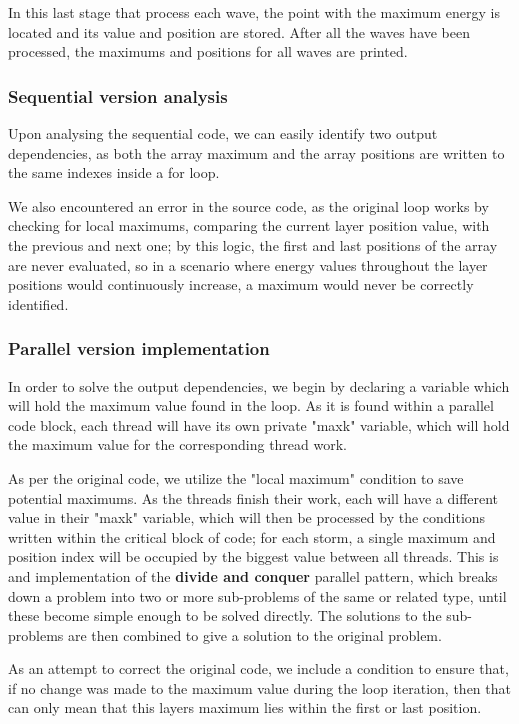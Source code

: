 
In this last stage that process each wave, the
point with the maximum energy is located and its value and position are stored.
After all the waves have been processed, the maximums and positions for all waves
are printed.
\subsubsection{Sequential version analysis}
Upon analysing the sequential code, we can easily identify two output dependencies, as both the array maximum and the array positions are written to the same indexes inside a for loop. 

We also encountered an error in the source code, as the original loop works by checking for local maximums, comparing the current layer position value, with the previous and next one; by this logic, the first and last positions of the array are never evaluated, so in a scenario where energy values throughout the layer positions would continuously increase, a maximum would never be correctly identified.
\subsubsection{Parallel version implementation}
In order to solve the output dependencies, we begin by declaring a variable which will hold the maximum value found in the loop. As it is found within a parallel code block, each thread will have its own private "maxk" variable, which will hold the maximum value for the corresponding thread work.

As per the original code, we utilize the "local maximum" condition to save potential maximums. As the threads finish their work, each will have a different value in their "maxk" variable, which will then be processed by the conditions written within the critical block of code; for each storm, a single maximum and position index will be occupied by the biggest value between all threads. This is and implementation of the \textbf{divide and conquer} parallel pattern, which breaks down a problem into two or more sub-problems of the same or related type, until these become simple enough to be solved directly. The solutions to the sub-problems are then combined to give a solution to the original problem.

As an attempt to correct the original code, we include a condition to ensure that, if no change was made to the maximum value during the loop iteration, then that can only mean that this layers maximum lies within the first or last position.